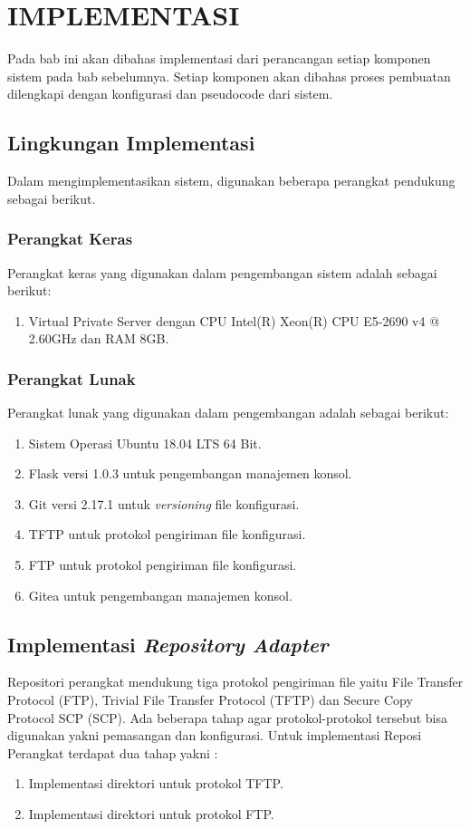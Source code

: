 \chapter{IMPLEMENTASI}
	Pada bab ini akan dibahas implementasi dari perancangan setiap komponen sistem pada bab sebelumnya. Setiap komponen akan dibahas proses pembuatan dilengkapi dengan konfigurasi dan pseudocode dari sistem.
	\section{Lingkungan Implementasi}
       Dalam mengimplementasikan sistem, digunakan beberapa perangkat pendukung sebagai berikut.
       \subsection{Perangkat Keras}
        	Perangkat keras yang digunakan dalam pengembangan sistem adalah sebagai berikut:
        	\begin{enumerate}
        		\item Virtual Private Server dengan CPU Intel(R) Xeon(R) CPU E5-2690 v4 @ 2.60GHz dan RAM 8GB.
        	\end{enumerate}
            
       \subsection{Perangkat Lunak}
    	    Perangkat lunak yang digunakan dalam pengembangan adalah sebagai berikut:
    	    \begin{enumerate}
    	    	\item Sistem Operasi Ubuntu 18.04 LTS 64 Bit.
    	    	\item Flask versi 1.0.3 untuk pengembangan manajemen konsol.
    	    	\item Git versi 2.17.1 untuk \textit{versioning} file konfigurasi.
    	    	\item TFTP untuk protokol pengiriman file konfigurasi.
    	    	\item FTP untuk protokol pengiriman file konfigurasi.
    	    	\item Gitea untuk pengembangan manajemen konsol. 
    	    	
    	    \end{enumerate}
       
    \section{Implementasi \textit{Repository Adapter}}
    	Repositori perangkat mendukung tiga protokol pengiriman file yaitu File Transfer Protocol (FTP), Trivial File Transfer Protocol (TFTP) dan Secure Copy Protocol SCP (SCP). Ada beberapa tahap agar protokol-protokol tersebut bisa digunakan yakni pemasangan dan konfigurasi. Untuk implementasi Reposi Perangkat terdapat dua tahap yakni :
    	\begin{enumerate}
    		\item Implementasi direktori untuk protokol TFTP.
    		\item Implementasi direktori untuk protokol FTP.
    	\end{enumerate}
